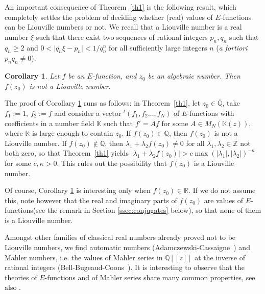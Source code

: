 \documentclass[JEP,XML,SOM,Unicode,published]{cedram}
\newcommand{\lcr}{[\![}
\newcommand{\rcr}{]\!]}
\newcommand{\Efunction}{$E$\nobreakdash-func\-tion\xspace}
\newcommand{\Efunctions}{$E$\nobreakdash-func\-tions\xspace}
\newtheorem{coro}{Corollary}
\theoremstyle{definition}
\newcommand{\tra}{{}^t}
\newcommand{\Z}{\mathbb{Z}}
\newcommand{\R}{\mathbb{R}}
\newcommand{\K}{\mathbb{K}}
\newcommand{\Qbar}{\overline{\mathbb Q}}
\begin{document}
An important consequence of Theorem~\ref{th1} is the following result, which completely settles the problem of deciding whether (real) values of \Efunctions can be Liouville numbers or not. We recall that a Liouville number is a real number $\xi$ such that there exist two sequences of rational integers $p_n, q_n$ such that $q_n\ge 2$ and $0<\vert q_n\xi-p_n\vert<1/q_n^{ n}$ for all sufficiently large integers $n$ ({\em a fortiori} $p_nq_n\neq 0$).

\begin{coro} \label{corliouville}
Let $f$ be an \Efunction, and $z_0$ be an algebraic number. Then $f(z_0)$ is not a Liouville number.
\end{coro}
The proof of Corollary \ref{corliouville} runs as follows: in Theorem~\ref{th1}, let $z_0\in \Qbar$, take $f_1:=1$, $f_2:=f$ and consider a vector $\tra (f_1, f_2\ldots, f_N)$ of \Efunctions with coefficients in a number field $\K$ such that $\underline f '=A\underline f$ for some $A\in M_N(\K(z))$, where $\K$ is large enough to contain $z_0$. If $f(z_0)\in \mathbb Q$, then $f(z_0)$ is not a Liouville number.
If $f(z_0)\notin \mathbb Q$, then $\lambda_1+\lambda_2 f(z_0)\neq 0$ for all $\lambda_1, \lambda_2\in\Z$ not both zero, so that Theorem~\ref{th1} yields
$\vert \lambda_1+\lambda_2 f(z_0)\vert>c\max(\vert \lambda_1\vert, \vert \lambda_2\vert)^{-\kappa}$ for some $c,\kappa>0$. This rules out the possibility that $f(z_0)$ is a Liouville number.

Of course, Corollary \ref{corliouville} is interesting only when $f(z_0)\in\R$. If we do not assume this, note however that the real and imaginary parts of $f(z_0)$ are values of \Efunctions (see the remark in Section \ref{ssec:conjugates} below), so that none of them is a Liouville number.

Amongst other families of classical real numbers already proved not to be Liouville numbers, we find automatic numbers (Adamczewski-Cassaigne~\cite{ac}) and Mahler numbers, i.e. the values of Mahler series in $\mathbb Q\lcr z\rcr$ at the inverse of rational integers (Bell-Bugeaud-Coons~\cite{bbc}). It is interesting to observe that the theories of \Efunctions and of Mahler series share many common properties, see also \cite{AF}.
\end{document}
